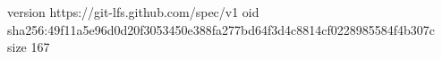 version https://git-lfs.github.com/spec/v1
oid sha256:49f11a5e96d0d20f3053450e388fa277bd64f3d4c8814cf0228985584f4b307c
size 167
